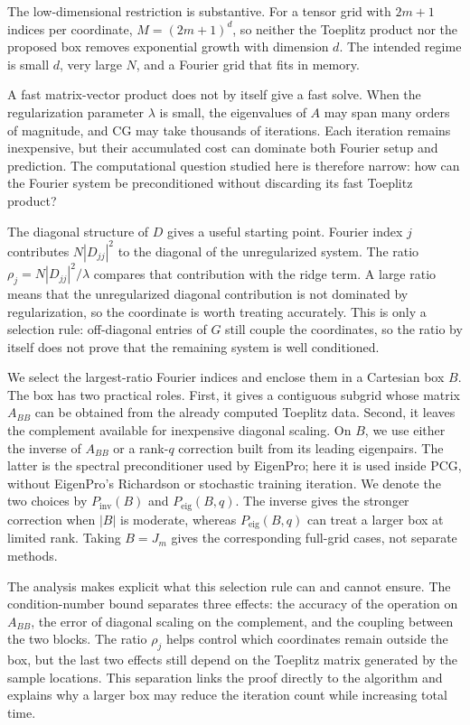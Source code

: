 The low-dimensional restriction is substantive. For a tensor grid with \(2m+1\)
indices per coordinate, \(M=(2m+1)^d\), so neither the Toeplitz product nor the
proposed box removes exponential growth with dimension \(d\). The intended
regime is small \(d\), very large \(N\), and a Fourier grid that fits in memory.

A fast matrix-vector product does not by itself give a fast solve. When the
regularization parameter \(\lambda\) is small, the eigenvalues of \(A\) may
span many orders of magnitude, and CG may take thousands of iterations. Each
iteration remains inexpensive, but their accumulated cost can dominate both
Fourier setup and prediction. The computational question studied here is
therefore narrow: how can the Fourier system be preconditioned without
discarding its fast Toeplitz product?

The diagonal structure of \(D\) gives a useful starting point. Fourier index
\(j\) contributes \(N|D_{jj}|^2\) to the diagonal of the unregularized system.
The ratio \(\rho_j=N|D_{jj}|^2/\lambda\) compares that contribution with the
ridge term. A large ratio means that the unregularized diagonal contribution is
not dominated by regularization, so the coordinate is worth treating
accurately. This is only a selection rule:
off-diagonal entries of \(G\) still couple the coordinates, so the ratio by
itself does not prove that the remaining system is well conditioned.

We select the largest-ratio Fourier indices and enclose them in a Cartesian
box \(B\). The box has two practical roles. First, it gives a contiguous
subgrid whose matrix \(A_{BB}\) can be obtained from the already computed
Toeplitz data. Second, it leaves the complement available for inexpensive
diagonal scaling. On \(B\), we use either the inverse of \(A_{BB}\) or a
rank-\(q\) correction built from its leading eigenpairs. The latter is the
spectral preconditioner used by EigenPro; here it is used inside PCG, without
EigenPro's Richardson or stochastic training iteration. We denote the two
choices by \(P_{\mathrm{inv}}(B)\) and \(P_{\mathrm{eig}}(B,q)\). The inverse
gives the stronger correction when \(|B|\) is moderate, whereas
\(P_{\mathrm{eig}}(B,q)\) can treat a larger box at limited rank. Taking
\(B=J_m\) gives the corresponding full-grid cases, not separate methods.

The analysis makes explicit what this selection rule can and cannot ensure.
The condition-number bound separates three effects: the accuracy of the
operation on \(A_{BB}\), the error of diagonal scaling on the complement, and
the coupling between the two blocks. The ratio \(\rho_j\) helps control which
coordinates remain outside the box, but the last two effects still depend on
the Toeplitz matrix generated by the sample locations. This separation links
the proof directly to the algorithm and explains why a larger box may reduce
the iteration count while increasing total time.

